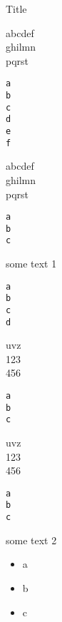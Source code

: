 \documentclass[9pt]{beamer}
\begin{document}
\begin{frame}[fragile,allowframebreaks=0.80]{Title}

abcdef\\
ghilmn\\
pqrst
\begin{lstlisting}
a
b
c
d
e
f
\end{lstlisting}

abcdef\\
ghilmn\\
pqrst
\begin{lstlisting}
a
b
c
\end{lstlisting}

some text 1
\begin{lstlisting}
a
b
c
d
\end{lstlisting}

uvz\\
123\\
456
\begin{lstlisting}
a
b
c
\end{lstlisting}

uvz\\
123\\
456
\begin{lstlisting}
a
b
c
\end{lstlisting}

some text 2
\begin{itemize}
\item a
\item b
\item c
\end{itemize}

\end{frame}
\end{document}
